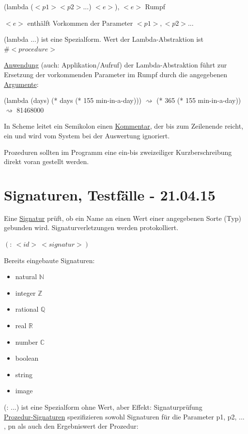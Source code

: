 \documentclass[a4paper, 20pt, openany]{book}
\begin{document}
\begin{center}
(lambda ($<p1> <p2> ...$) $<e>$), $<e>$ Rumpf
\end{center}

$<e>$ enthälft Vorkommen der Parameter $<p1>,<p2>$...

(lambda ...) ist eine Spezialform. Wert der Lambda-Abstraktion ist $\#<procedure>$

\uline{Anwendung} (auch: Applikation/Aufruf) der Lambda-Abstraktion führt zur Ersetzung der vorkommenden Parameter im Rumpf durch die angegebenen \uline{Argumente}: 

(lambda (days) (* days (* 155 min-in-a-day))) $\rightsquigarrow$ (* 365 (* 155 min-in-a-day)) $\rightsquigarrow$ 81468000

In Scheme leitet ein Semikolon einen \uline{Kommentar}, der bis zum Zeilenende reicht, ein und wird vom System bei der Auswertung ignoriert.

Prozeduren sollten im Programm eine ein-bis zweizeiliger Kurzberschreibung direkt voran gestellt werden.



\chapter{Signaturen, Testfälle - 21.04.15}
Eine \underline{Signatur} prüft, ob ein Name an einen Wert einer angegebenen Sorte (Typ) gebunden wird. Signaturverletzungen werden protokolliert.

\begin{center}
$(: \ <id>  \ <signatur>)$
\end{center}

Bereits eingebaute Signaturen:

\begin{itemize}
\item natural $\mathbb{N}$
\item integer $\mathbb{Z}$
\item rational $\mathbb{Q}$
\item real $\mathbb{R}$
\item number $\mathbb{C}$
\item boolean
\item string
\item image
\end{itemize}

(: ...) ist eine Spezialform ohne Wert, aber Effekt: Signaturprüfung \\

\underline{Prozedur-Signaturen} spezifizieren sowohl Signaturen für die Parameter p1, p2, ... , pn als auch den Ergebniswert der Prozedur:
\end{document}
